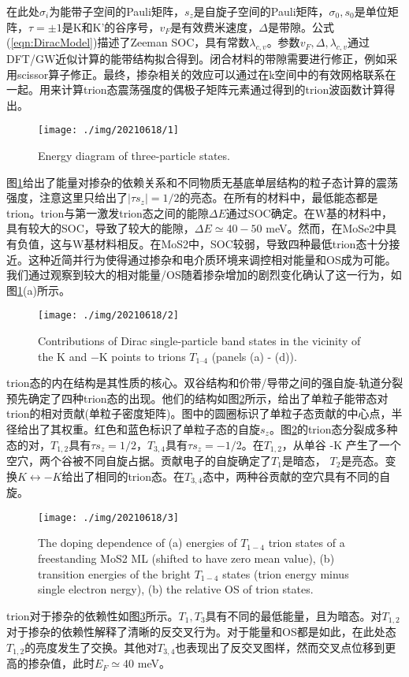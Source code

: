 \documentclass[reprint, aps, prb, showkeys]{revtex4-2}
\begin{document}
在此处$\sigma_i$为能带子空间的Pauli矩阵，$s_z$是自旋子空间的Pauli矩阵，$\sigma_0, s_0$是单位矩阵，$\tau = \pm 1$是K和K'的谷序号，$v_F$是有效费米速度，$\Delta$是带隙。公式(\ref{eqn:DiracModel})描述了Zeeman SOC，具有常数$\lambda_{c, v}$。参数$v_F, \Delta, \lambda_{c, v}$通过DFT/GW近似计算的能带结构拟合得到。闭合材料的带隙需要进行修正，例如采用scissor算子修正。最终，掺杂相关的效应可以通过在k空间中的有效网格联系在一起。用来计算trion态震荡强度的偶极子矩阵元素通过得到的trion波函数计算得出。
\begin{figure}[t]
    \texttt{[image: ./img/20210618/1]}
    \caption{\label{fig:EnergyDiagram} 
    Energy diagram of three-particle states.
    }
\end{figure}
图\ref{fig:EnergyDiagram}给出了能量对掺杂的依赖关系和不同物质无基底单层结构的粒子态计算的震荡强度，注意这里只给出了$\left\vert \tau s_z \right\vert = 1/2$的亮态。在所有的材料中，最低能态都是trion。trion与第一激发trion态之间的能隙$\Delta E$通过SOC确定。在W基的材料中，具有较大的SOC，导致了较大的能隙，$\Delta E \simeq 40 -50$ meV。然而，在MoSe2中具有负值，这与W基材料相反。在MoS2中，SOC较弱，导致四种最低trion态十分接近。这种近简并行为使得通过掺杂和电介质环境来调控相对能量和OS成为可能。我们通过观察到较大的相对能量/OS随着掺杂增加的剧烈变化确认了这一行为，如图\ref{fig:EnergyDiagram}(a)所示。

\begin{figure}[b]
    \texttt{[image: ./img/20210618/2]}
    \caption{\label{fig:trionStructure} 
    Contributions of Dirac single-particle band states in the vicinity of the K and −K points to trions $T_{1–4}$ (panels (a) - (d)).
    }
\end{figure}
trion态的内在结构是其性质的核心。双谷结构和价带/导带之间的强自旋-轨道分裂预先确定了四种trion态的出现。他们的结构如图\ref{fig:trionStructure}所示，给出了单粒子能带态对trion的相对贡献(单粒子密度矩阵)。图中的圆圈标识了单粒子态贡献的中心点，半径给出了其权重。红色和蓝色标识了单粒子态的自旋$s_z$。图\ref{fig:trionStructure}的trion态分裂成多种态的对，$T_{1,2}$具有$\tau s_z = 1/2$，$T_{3, 4}$具有$\tau s_z = -1/2$。在$T_{1,2}$，从单谷 -K 产生了一个空穴，两个谷被不同自旋占据。贡献电子的自旋确定了$T_1$是暗态， $T_2$是亮态。变换$K \leftrightarrow -K$给出了相同的trion态。在$T_{3,4}$态中，两种谷贡献的空穴具有不同的自旋。

\begin{figure}[b]
    \texttt{[image: ./img/20210618/3]}
    \caption{\label{fig:doping} 
    The doping dependence of (a) energies of $T_{1−4}$ trion states of a freestanding MoS2 ML (shifted to have zero mean value), (b) transition energies of the bright $T_{1−4}$ states (trion energy minus single electron  nergy), (b) the relative OS of trion states.
    }
\end{figure}
trion对于掺杂的依赖性如图\ref{fig:doping}所示。$T_1, T_3$具有不同的最低能量，且为暗态。对$T_{1,2}$对于掺杂的依赖性解释了清晰的反交叉行为。对于能量和OS都是如此，在此处态$T_{1, 2}$的亮度发生了交换。其他对$T_{3, 4}$也表现出了反交叉图样，然而交叉点位移到更高的掺杂值，此时$E_F \simeq 40$ meV。
\end{document}
